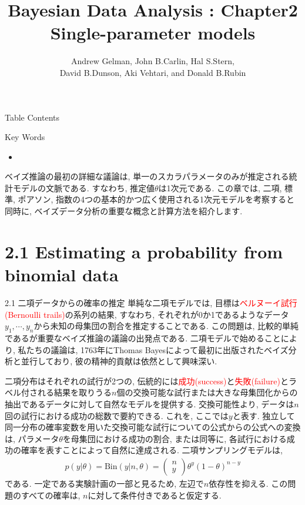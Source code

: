 \documentclass[10pt,dvipdfmx,a4]{beamer}
\title{Bayesian Data Analysis : Chapter2 \\Single-parameter models}
\subtitle{Andrew Gelman, John B.Carlin, Hal S.Stern,\\David B.Dunson, Aki Vehtari, and Donald B.Rubin}
\newcommand{\eq}[1]{\begin{align}#1\end{align}}
\newcommand{\tcr}[1]{\textcolor{red}{#1}}
\begin{document}
\frame{\titlepage}

\begin{frame}{Table Contents}
\begin{multicols}{2}
{\scriptsize \tableofcontents}
\end{multicols}
\end{frame}

\begin{frame}{Key Words}
\begin{multicols}{2}
{\scriptsize \begin{itemize}
\item 
\end{itemize}}
\end{multicols}
\end{frame}


\begin{frame}
ベイズ推論の最初の詳細な議論は, 単一のスカラパラメータのみが推定される統計モデルの文脈である.
すなわち, 推定値$\theta$は1次元である.
この章では, 二項, 標準, ポアソン, 指数の4つの基本的かつ広く使用される1次元モデルを考察すると同時に, ベイズデータ分析の重要な概念と計算方法を紹介します.
\end{frame}

\section{2.1 Estimating a probability from binomial data}
\begin{frame}{2.1 二項データからの確率の推定}
単純な二項モデルでは, 目標は\tcr{ベルヌーイ試行(Bernoulli trails)}の系列の結果, すなわち, それぞれが0か1であるようなデータ$y_1,\cdots,y_n$から未知の母集団の割合を推定することである.
この問題は, 比較的単純であるが重要なベイズ推論の議論の出発点である.
二項モデルで始めることにより, 私たちの議論は, 1763年にThomas Bayesによって最初に出版されたベイズ分析と並行しており, 彼の精神的貢献は依然として興味深い.

二項分布はそれぞれの試行が2つの, 伝統的には\tcr{成功(success)}と\tcr{失敗(failure)}とラベル付される結果を取りうる$n$個の交換可能な試行または大きな母集団化からの抽出であるデータに対して自然なモデルを提供する.
交換可能性より, データは$n$回の試行における成功の総数で要約できる.
これを, ここでは$y$と表す.
独立して同一分布の確率変数を用いた交換可能な試行についての公式からの公式への変換は, パラメータ$\theta$を母集団における成功の割合, または同等に, 各試行における成功の確率を表すことによって自然に達成される.
二項サンプリングモデルは,
\eq{p(y|\theta)=\text{Bin}(y|n,\theta)=\left(\begin{array}{c}n\\y\end{array}\right)\theta^y(1-\theta)^{n-y}}
である.
一定である実験計画の一部と見るため, 左辺で$n$依存性を抑える.
この問題のすべての確率は, $n$に対して条件付きであると仮定する.
\end{frame}
\end{document}
